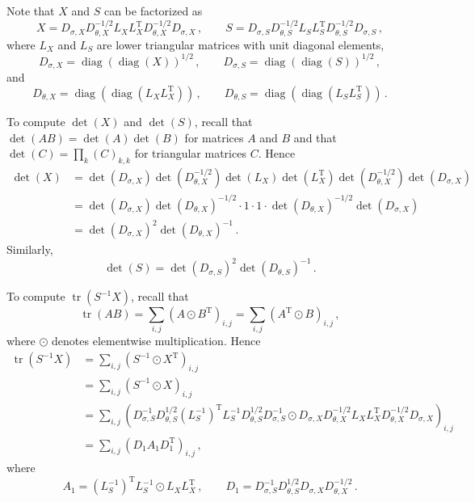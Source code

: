 \documentclass[12pt]{article}
\DeclareMathOperator{\tr}{tr}
\DeclareMathOperator{\diag}{diag}
\newcommand{\transpose}[1]{#1^{\mathrm{T}}}
\begin{document}
Note that $X$ and $S$ can be factorized as
\begin{equation}
X = D_{\sigma,X} D_{\theta,X}^{-1/2} L_{X} \transpose{L_{X}} D_{\theta,X}^{-1/2} D_{\sigma,X}\,,\qquad S = D_{\sigma,S} D_{\theta,S}^{-1/2} L_{S} \transpose{L_{S}} D_{\theta,S}^{-1/2} D_{\sigma,S}\,,
\end{equation}
where $L_{X}$ and $L_{S}$ are lower triangular matrices
with unit diagonal elements,
\begin{equation}
D_{\sigma,X} = \diag(\diag(X))^{1/2}\,,\qquad D_{\sigma,S} = \diag(\diag(S))^{1/2}\,,
\end{equation}
and
\begin{equation}
D_{\theta,X} = \diag(\diag(L_{X} \transpose{L_{X}}))\,,\qquad D_{\theta,S} = \diag(\diag(L_{S} \transpose{L_{S}}))\,.
\end{equation}

To compute $\det(X)$ and $\det(S)$, recall that
$\det(A B) = \det(A) \det(B)$ for matrices $A$ and $B$
and that
$\det(C) = \prod_{k} (C)_{k,k}$ for triangular matrices $C$.
Hence
\begin{equation}
\begin{aligned}
\det(X)
  &= \det(D_{\sigma,X}) \det(D_{\theta,X}^{-1/2}) \det(L_{X}) \det(\transpose{L_{X}}) \det(D_{\theta,X}^{-1/2}) \det(D_{\sigma,X}) \\
  &= \det(D_{\sigma,X}) \det(D_{\theta,X})^{-1/2} \cdot 1 \cdot 1 \cdot \det(D_{\theta,X})^{-1/2} \det(D_{\sigma,X}) \\
  &= \det(D_{\sigma,X})^{2} \det(D_{\theta,X})^{-1}\,.
\end{aligned}
\end{equation}
Similarly,
\begin{equation}
\det(S) = \det(D_{\sigma,S})^{2} \det(D_{\theta,S})^{-1}\,.
\end{equation}

To compute $\tr(S^{-1} X)$, recall that
\begin{equation}
\tr(A B) = \sum_{i,j} (A \odot \transpose{B})_{i,j} = \sum_{i,j} (\transpose{A} \odot B)_{i,j}\,,
\end{equation}
where $\odot$ denotes elementwise multiplication. Hence
\begin{equation}
\begin{aligned}
\tr(S^{-1} X)
  &= \sum_{i,j} (S^{-1} \odot \transpose{X})_{i,j} \\
  &= \sum_{i,j} (S^{-1} \odot X)_{i,j} \\
  &= \sum_{i,j} (D_{\sigma,S}^{-1} D_{\theta,S}^{1/2} \transpose{(L_{S}^{-1})} L_{S}^{-1} D_{\theta,S}^{1/2} D_{\sigma,S}^{-1} \odot D_{\sigma,X} D_{\theta,X}^{-1/2} L_{X} \transpose{L_{X}} D_{\theta,X}^{-1/2} D_{\sigma,X})_{i,j} \\
  &= \sum_{i,j} (D_{1} A_{1} \transpose{D_{1}})_{i,j}\,,
\end{aligned}
\end{equation}
where
\begin{equation}
A_{1} = \transpose{(L_{S}^{-1})} L_{S}^{-1} \odot L_{X} \transpose{L_{X}}\,,\qquad D_{1} = D_{\sigma,S}^{-1} D_{\theta,S}^{1/2} D_{\sigma,X} D_{\theta,X}^{-1/2}\,.
\end{equation}
\end{document}
